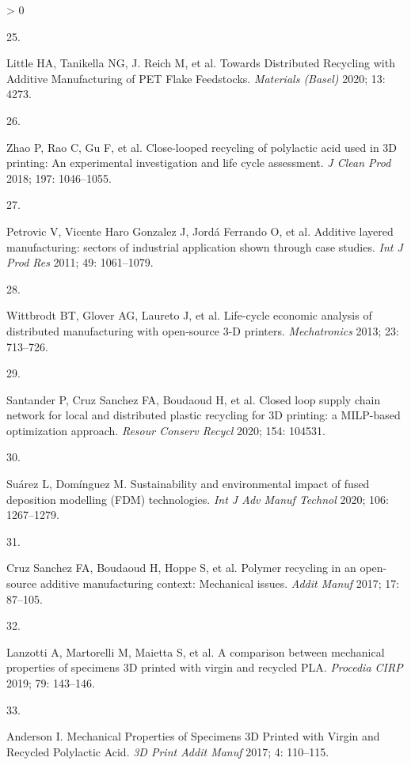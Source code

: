 \documentclass[
  12pt]{article}
\newlength{\cslhangindent}
\newlength{\csllabelwidth}
\newenvironment{CSLReferences}[2] %
 {%
  \setlength{\parindent}{0pt}
  \ifodd #1 \everypar{\setlength{\hangindent}{\cslhangindent}}\ignorespaces\fi
  \ifnum #2 > 0
  \setlength{\parskip}{#2\baselineskip}
  \fi
 }%
 {}
\newcommand{\CSLLeftMargin}[1]{\parbox[t]{\csllabelwidth}{#1}}
\newcommand{\CSLRightInline}[1]{\parbox[t]{\linewidth - \csllabelwidth}{#1}\break}
\begin{document}
\begin{CSLReferences}{0}{0}
\leavevmode\hypertarget{ref-Little2020}{}%
\CSLLeftMargin{25. }
\CSLRightInline{Little HA, Tanikella NG, J. Reich M, et al. {Towards Distributed Recycling with Additive Manufacturing of PET Flake Feedstocks}. \emph{Materials (Basel)} 2020; 13: 4273.}

\leavevmode\hypertarget{ref-Zhao2018}{}%
\CSLLeftMargin{26. }
\CSLRightInline{Zhao P, Rao C, Gu F, et al. {Close-looped recycling of polylactic acid used in 3D printing: An experimental investigation and life cycle assessment}. \emph{J Clean Prod} 2018; 197: 1046--1055.}

\leavevmode\hypertarget{ref-Petrovic2011}{}%
\CSLLeftMargin{27. }
\CSLRightInline{Petrovic V, Vicente Haro Gonzalez J, Jordá Ferrando O, et al. {Additive layered manufacturing: sectors of industrial application shown through case studies}. \emph{Int J Prod Res} 2011; 49: 1061--1079.}

\leavevmode\hypertarget{ref-Wittbrodt2013}{}%
\CSLLeftMargin{28. }
\CSLRightInline{Wittbrodt BT, Glover AG, Laureto J, et al. {Life-cycle economic analysis of distributed manufacturing with open-source 3-D printers}. \emph{Mechatronics} 2013; 23: 713--726.}

\leavevmode\hypertarget{ref-Santander2020}{}%
\CSLLeftMargin{29. }
\CSLRightInline{Santander P, Cruz Sanchez FA, Boudaoud H, et al. {Closed loop supply chain network for local and distributed plastic recycling for 3D printing: a MILP-based optimization approach}. \emph{Resour Conserv Recycl} 2020; 154: 104531.}

\leavevmode\hypertarget{ref-Suarez2020}{}%
\CSLLeftMargin{30. }
\CSLRightInline{Suárez L, Domínguez M. {Sustainability and environmental impact of fused deposition modelling (FDM) technologies}. \emph{Int J Adv Manuf Technol} 2020; 106: 1267--1279.}

\leavevmode\hypertarget{ref-CruzSanchez2017}{}%
\CSLLeftMargin{31. }
\CSLRightInline{Cruz Sanchez FA, Boudaoud H, Hoppe S, et al. {Polymer recycling in an open-source additive manufacturing context: Mechanical issues}. \emph{Addit Manuf} 2017; 17: 87--105.}

\leavevmode\hypertarget{ref-Lanzotti2019}{}%
\CSLLeftMargin{32. }
\CSLRightInline{Lanzotti A, Martorelli M, Maietta S, et al. {A comparison between mechanical properties of specimens 3D printed with virgin and recycled PLA}. \emph{Procedia CIRP} 2019; 79: 143--146.}

\leavevmode\hypertarget{ref-Anderson2017}{}%
\CSLLeftMargin{33. }
\CSLRightInline{Anderson I. {Mechanical Properties of Specimens 3D Printed with Virgin and Recycled Polylactic Acid}. \emph{3D Print Addit Manuf} 2017; 4: 110--115.}


\end{CSLReferences}
\end{document}
